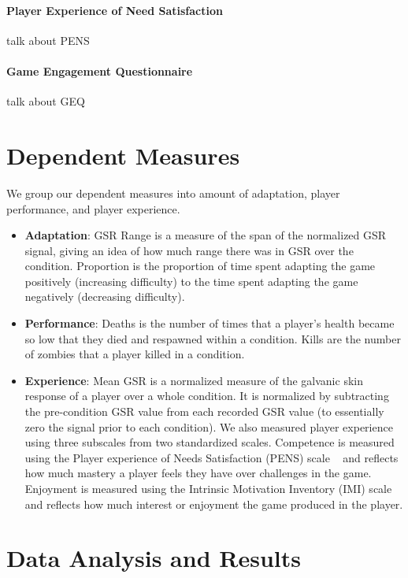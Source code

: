 \paragraph{Player Experience of Need Satisfaction} talk about PENS

\paragraph{Game Engagement Questionnaire} talk about GEQ

\section{Dependent Measures}

We group our dependent measures into amount of adaptation, player performance, and player experience.

\begin{itemize}
	\item \textbf{Adaptation}: GSR Range is a measure of the span of the normalized GSR signal, giving an idea of how much range there was in GSR over the condition. Proportion is the proportion of time spent adapting the game positively (increasing difficulty) to the time spent adapting the game negatively (decreasing difficulty).

	\item \textbf{Performance}: Deaths is the number of times that a player’s health became so low that they died and respawned within a condition. Kills are the number of zombies that a player killed in a condition.

	\item \textbf{Experience}: Mean GSR is a normalized measure of the galvanic skin response of a player over a whole condition. It is normalized by subtracting the pre-condition GSR value from each recorded GSR value (to essentially zero the signal prior to each condition). We also measured player experience using three subscales from two standardized scales. Competence is measured using the Player experience of Needs Satisfaction (PENS) scale ~\cite{ryan2006motivational} and reflects how much mastery a player feels they have over challenges in the game. Enjoyment is measured using the Intrinsic Motivation Inventory (IMI) scale ~\cite{ryan1982control} and reflects how much interest or enjoyment the game produced in the player.
\end{itemize}


\section{Data Analysis and Results}

